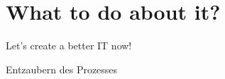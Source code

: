 \documentclass[aspectratio=169,usenames,dvipsnames]{beamer}
\begin{document}
{
    \begin{frame}[plain]
    \end{frame}
}


\section{What to do about it?}

\begin{frame}
\begin{center}
\vfill
\huge Let's create a better IT now!
\bigskip
 
\Large Entzaubern des Prozesses
\vfill
\end{center}
\end{frame}
\end{document}
